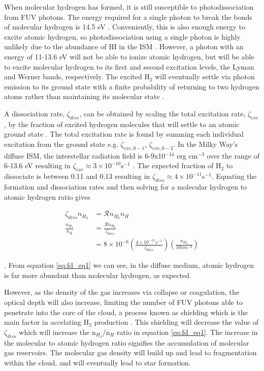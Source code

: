 When molecular hydrogen has formed, it is still susceptible to photodissociation from FUV photons.  The energy required for a single photon to break the bonds of molecular hydrogen is 14.5 eV \citep{krumholz2014}.  Conveniently, this is also enough energy to excite atomic hydrogen, so photodissociation using a single photon is highly unlikely due to the abundance of HI in the ISM \citep{krumholz2014}.  However, a photon with an energy of 11-13.6 eV will not be able to ionize atomic hydrogen, but will be able to excite molecular hydrogen to its first and second excitation levels, the Lyman and Werner bands, respectively.  The excited H$_2$ will eventually settle via photon emission to its ground state with a finite probability of returning to two hydrogen atoms rather than maintaining its molecular state \citep{krumholz2014}.

A dissociation rate, $\zeta_{diss}$, can be obtained by scaling the total excitation rate, $\zeta_{exc}$, by the fraction of excited hydrogen molecules that will settle to an atomic ground state \citep{krumholz2014}.  The total excitation rate is found by summing each individual excitation from the ground state e.g. $\zeta_{exc,0-1}$, $\zeta_{exc,0-2}$.  In the Milky Way's diffuse ISM, the interstellar radiation field is 6-9x10$^{-14}$ erg cm$^{-3}$ over the range of 6-13.6 eV resulting in $\zeta_{exc} \approx 3\times10^{-10}$s$^{-1}$ \citep{draine2011}.  The expected fraction of H$_2$ to dissociate is between 0.11 and 0.13 resulting in $\zeta_{diss}\approx4\times10^{-11}$s$^{-1}$\citep{draine2011}.
Equating the formation and dissociation rates and then solving for a molecular hydrogen to atomic hydrogen ratio gives

\begin{equation}\label{eq:fd_eq1}
  \begin{split}
    \zeta_{diss} n_{H_2} & = \mathcal{R}n_{H_0}n_H \\
    \frac{n_{H_2}}{n_H} & = \frac{\mathcal{R}n_{H_0}}{\zeta_{diss}} \\
                        & = 8\times10^{-6}\left(\frac{4\times10^{-11}s^{-1}}{\zeta_{diss}}\right)\left(\frac{n_{H_0}}{10cm^{-3}}\right)
  \end{split}
\end{equation}

\noindent \citep{krumholz2014}.  From equation \ref{eq:fd_eq1} we can see, in the diffuse medium, atomic hydrogen is far more abundant than molecular hydrogen, as expected.

However, as the density of the gas increases via collapse or coagulation, the optical depth will also increase, limiting the number of FUV photons able to penetrate into the core of the cloud, a process known as shielding which is the main factor in accelating H$_2$ production \citep{draine2011}.  This shielding will decrease the value of $\zeta_{diss}$ which will increase the n$_{H_2}$/n$_H$ ratio in equation \ref{eq:fd_eq1}.  The increase in the molecular to atomic hydrogen ratio signifies the accumulation of molecular gas reservoirs.  The molecular gas density will build up and lead to fragmentation within the cloud, and will eventually lead to star formation.  

